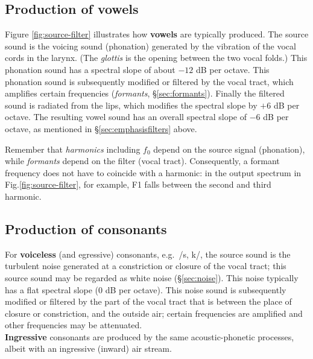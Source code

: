 \documentclass[
]{book}
\begin{document}
\subsection{Production of vowels}\label{sec:vowelproduction}

Figure \ref{fig:source-filter} illustrates how \textbf{vowels} are typically produced. The source sound is the voicing sound (phonation) generated by the vibration of the vocal cords in the larynx. (The \emph{glottis} is the opening between the two vocal folds.) This phonation sound has a spectral slope of about \(-12\) dB per octave. This phonation sound is subsequently modified or filtered by the vocal tract, which amplifies certain frequencies (\emph{formants}, §\ref{sec:formants}). Finally the filtered sound is radiated from the lips, which modifies the spectral slope by \(+6\) dB per octave. The resulting vowel sound has an overall spectral slope of \(-6\) dB per octave, as mentioned in §\ref{sec:emphasisfilters} above.

Remember that \emph{harmonics} including \(f_0\) depend on the source signal (phonation), while \emph{formants} depend on the filter (vocal tract). Consequently, a formant frequency does not have to coincide with a harmonic: in the output spectrum in Fig.\ref{fig:source-filter}, for example, F1 falls between the second and third harmonic.

\subsection{Production of consonants}\label{production-of-consonants}

For \textbf{voiceless} (and egressive) consonants, e.g.~/s, k/, the source sound is the turbulent noise generated at a constriction or closure of the vocal tract; this source sound may be regarded as white noise (§\ref{sec:noise}). This noise typically has a flat spectral slope (\(0\) dB per octave). This noise sound is subsequently modified or filtered by the part of the vocal tract that is between the place of closure or constriction, and the outside air; certain frequencies are amplified and other frequencies may be attenuated.\\

\textbf{Ingressive} consonants are produced by the same acoustic-phonetic processes, albeit with an ingressive (inward) air stream.
\end{document}
